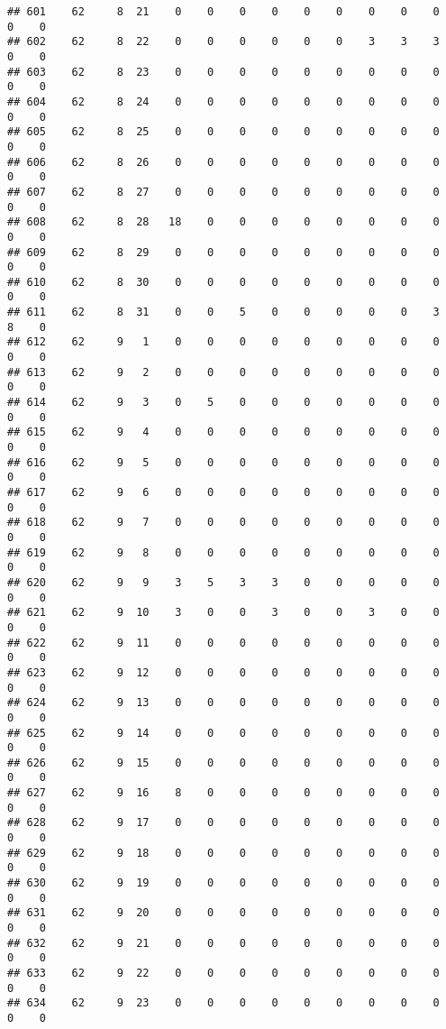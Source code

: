 \documentclass[]{article}
\begin{document}
\begin{verbatim}
## 601    62     8  21    0    0    0    0    0    0    0    0    0    0    0
## 602    62     8  22    0    0    0    0    0    0    3    3    3    0    0
## 603    62     8  23    0    0    0    0    0    0    0    0    0    0    0
## 604    62     8  24    0    0    0    0    0    0    0    0    0    0    0
## 605    62     8  25    0    0    0    0    0    0    0    0    0    0    0
## 606    62     8  26    0    0    0    0    0    0    0    0    0    0    0
## 607    62     8  27    0    0    0    0    0    0    0    0    0    0    0
## 608    62     8  28   18    0    0    0    0    0    0    0    0    0    0
## 609    62     8  29    0    0    0    0    0    0    0    0    0    0    0
## 610    62     8  30    0    0    0    0    0    0    0    0    0    0    0
## 611    62     8  31    0    0    5    0    0    0    0    0    3    8    0
## 612    62     9   1    0    0    0    0    0    0    0    0    0    0    0
## 613    62     9   2    0    0    0    0    0    0    0    0    0    0    0
## 614    62     9   3    0    5    0    0    0    0    0    0    0    0    0
## 615    62     9   4    0    0    0    0    0    0    0    0    0    0    0
## 616    62     9   5    0    0    0    0    0    0    0    0    0    0    0
## 617    62     9   6    0    0    0    0    0    0    0    0    0    0    0
## 618    62     9   7    0    0    0    0    0    0    0    0    0    0    0
## 619    62     9   8    0    0    0    0    0    0    0    0    0    0    0
## 620    62     9   9    3    5    3    3    0    0    0    0    0    0    0
## 621    62     9  10    3    0    0    3    0    0    3    0    0    0    0
## 622    62     9  11    0    0    0    0    0    0    0    0    0    0    0
## 623    62     9  12    0    0    0    0    0    0    0    0    0    0    0
## 624    62     9  13    0    0    0    0    0    0    0    0    0    0    0
## 625    62     9  14    0    0    0    0    0    0    0    0    0    0    0
## 626    62     9  15    0    0    0    0    0    0    0    0    0    0    0
## 627    62     9  16    8    0    0    0    0    0    0    0    0    0    0
## 628    62     9  17    0    0    0    0    0    0    0    0    0    0    0
## 629    62     9  18    0    0    0    0    0    0    0    0    0    0    0
## 630    62     9  19    0    0    0    0    0    0    0    0    0    0    0
## 631    62     9  20    0    0    0    0    0    0    0    0    0    0    0
## 632    62     9  21    0    0    0    0    0    0    0    0    0    0    0
## 633    62     9  22    0    0    0    0    0    0    0    0    0    0    0
## 634    62     9  23    0    0    0    0    0    0    0    0    0    0    0

\end{verbatim}
\end{document}
